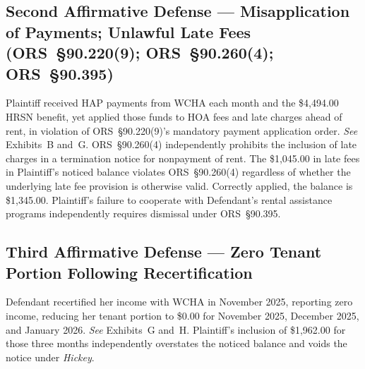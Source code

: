 \documentclass[10pt,letterpaper,oneside]{extarticle}
\begin{document}
\subsection{\textbf{Second Affirmative Defense ---
		Misapplication of Payments; Unlawful Late Fees
		(ORS~\S90.220(9); ORS~\S90.260(4);
		ORS~\S90.395)}}
Plaintiff received HAP payments from WCHA each month and
the \$4,494.00 HRSN benefit, yet applied those funds to HOA
fees and late charges ahead of rent, in violation of
ORS~\S90.220(9)'s mandatory payment application order.
\textit{See} Exhibits~B and~G. ORS~\S90.260(4) independently
prohibits the inclusion of late charges in a termination
notice for nonpayment of rent. The \$1,045.00 in late fees
in Plaintiff's noticed balance violates ORS~\S90.260(4)
regardless of whether the underlying late fee provision is
otherwise valid. Correctly applied, the balance is
\$1,345.00. Plaintiff's failure to cooperate with
Defendant's rental assistance programs independently
requires dismissal under ORS~\S90.395.
\subsection{\textbf{Third Affirmative Defense ---
		Zero Tenant Portion Following Recertification}}
Defendant recertified her income with WCHA in November 2025,
reporting zero income, reducing her tenant portion to
\$0.00 for November 2025, December 2025, and January 2026.
\textit{See} Exhibits~G and~H. Plaintiff's inclusion of
\$1,962.00 for those three months independently overstates
the noticed balance and voids the notice under
\textit{Hickey}.
\end{document}
